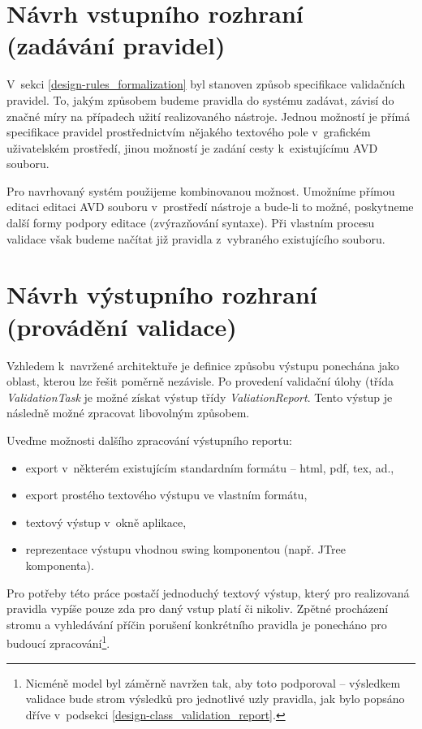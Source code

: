 \section{Návrh vstupního rozhraní (zadávání pravidel)}
V~sekci \ref{design-rules_formalization} byl stanoven způsob specifikace validačních pravidel. To, jakým způsobem budeme pravidla do systému zadávat, závisí do značné míry na případech užití realizovaného nástroje. Jednou možností je přímá specifikace pravidel prostřednictvím nějakého textového pole v~grafickém uživatelském prostředí, jinou možností je zadání cesty k~existujícímu AVD souboru.

Pro navrhovaný systém použijeme kombinovanou možnost. Umožníme přímou editaci editaci AVD souboru v~prostředí nástroje a bude-li to možné, poskytneme další formy podpory editace (zvýrazňování syntaxe). Při vlastním procesu validace však budeme načítat již pravidla z~vybraného existujícího souboru.

\section{Návrh výstupního rozhraní (provádění validace)}

Vzhledem k~navržené architektuře je definice způsobu výstupu ponechána jako oblast, kterou lze řešit poměrně nezávisle. Po provedení validační úlohy (třída \emph{ValidationTask} je možné získat výstup třídy \emph{ValiationReport}. Tento výstup je následně možné zpracovat libovolným způsobem.

Uveďme možnosti dalšího zpracování výstupního reportu:

\begin{itemize}
\item export v~některém existujícím standardním formátu -- html, pdf, tex, ad.,
\item export prostého textového výstupu ve vlastním formátu,
\item textový výstup v~okně aplikace,
\item reprezentace výstupu vhodnou swing komponentou (např. JTree komponenta).
\end{itemize}

Pro potřeby této práce postačí jednoduchý textový výstup, který pro realizovaná pravidla vypíše pouze zda pro daný vstup platí či nikoliv. Zpětné procházení stromu a vyhledávání příčin porušení konkrétního pravidla je ponecháno pro budoucí zpracování\footnote{Nicméně model byl záměrně navržen tak, aby toto podporoval -- výsledkem validace bude strom výsledků pro jednotlivé uzly pravidla, jak bylo popsáno dříve v~podsekci \ref{design-class_validation_report}.}.

